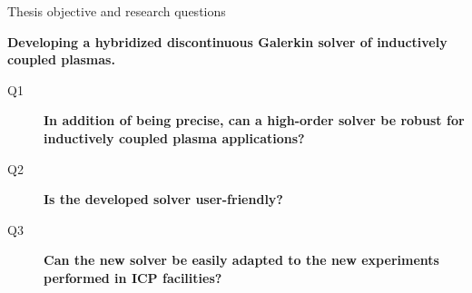 \documentclass[24pt,t,table, aspectratio=169]{beamer}
\begin{document}
\begin{frame}{Thesis objective and research questions}

\begin{framed}
\textbf{Developing a hybridized discontinuous Galerkin solver of inductively coupled plasmas.}
\end{framed}


\begin{description}
\item[Q1] \textbf{In addition of being precise, can a high-order solver be robust for inductively coupled plasma applications?}
\item[Q2] \textbf{Is the developed solver user-friendly?} 
\item[Q3] \textbf{Can the new solver be easily adapted to the new experiments performed in ICP facilities?}
\end{description}


\end{frame}

%
%
%
\end{document}

